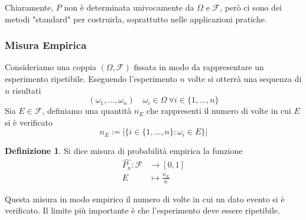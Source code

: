 \documentclass{article}
\theoremstyle{plain}
\theoremstyle{definition}
\newtheorem{definizione}{Definizione}[section]
\theoremstyle{remark}
\begin{document}
Chiaramente, $P$ non è determinata univocamente da $\Omega$ e $\mathscr{F}$, però ci sono dei metodi "standard" per costruirla, soprattutto nelle applicazioni pratiche.
\subsubsection{Misura Empirica} %
\label{subs:misura_empirica}
Consideriamo una coppia $(\Omega,\mathscr{F})$ fissata in modo da rappresentare un esperimento ripetibile. Eseguendo l'esperimento $n$ volte si otterrà una sequenza di $n$ risultati
\begin{equation*}
	(\omega_1,...,\omega_n)\quad \omega_i\in\Omega\ \forall i\in\{1,...,n\}
\end{equation*}
Sia $E\in\mathscr{F}$, definiamo una quantità $n_E$ che rappresenti il numero di volte in cui $E$ si è verificato
\begin{equation*}
	n_E:=\lvert\{i\in\{1,...,n\}:\omega_i\in E\}\rvert
\end{equation*}
\begin{definizione}
	Si dice misura di probabilità empirica la funzione
	\begin{align*}
		\hat{P_n}:\mathscr{F}&\to[0,1]\\
		E&\mapsto\frac{n_E}{n}
	\end{align*}
\end{definizione}
Questa misura in modo empirico il numero di volte in cui un dato evento si è verificato. Il limite più importante è che l'esperimento deve essere ripetibile.
\end{document}

